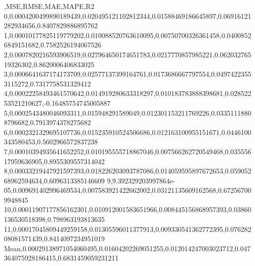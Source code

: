 ,MSE,RMSE,MAE,MAPE,R2
0,0.0004200499890189439,0.020495121102812344,0.01588469186645897,0.06916121282934656,0.8407829886895762
1,0.00010177825119779202,0.010088520763610095,0.00750700326361458,0.04008526849151682,0.7582526194067526
2,0.0007820216593906519,0.027964650174651783,0.0217770857985221,0.06203276519326302,0.8620006406833025
3,0.0006641637174173709,0.02577137399164761,0.0173686667797554,0.04974223553115272,0.7317758531329412
4,0.00022258493461570642,0.014919280633318297,0.010183783888398681,0.02852253521210627,-0.16485754745005887
5,0.0002543480046093311,0.015948291589049,0.012301153211769226,0.03351118808796682,0.7913974378275682
6,0.0002321329695107736,0.015235910524506686,0.012163100955151671,0.0446100343580453,0.5602966572837238
7,0.00010394935641652252,0.010195555718867046,0.007566262720549468,0.03555617959636905,0.8955309557314042
8,0.00033219447921597393,0.018226203093787086,0.014059595897672653,0.05905268962594634,0.6096313385146609
9,9.392329203997864e-05,0.009691402996469534,0.007583921422662002,0.03121135609162568,0.672567009948845
10,0.00011907177856162301,0.010912001583651966,0.008445156868957393,0.03860136530518398,0.798963193813635
11,0.00017045809449259158,0.01305596011377913,0.009330541362772395,0.07628208081571439,0.8414097234951019
Mean,0.00029138971054060495,0.01604202269051255,0.012014247003023712,0.047364075928186415,0.6831459059231211
